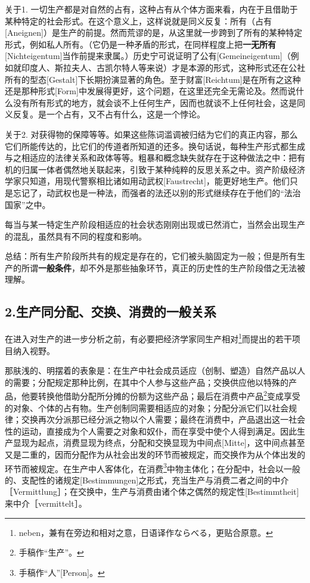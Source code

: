 \documentclass[a5paper,twoside,10.5pt]{ctexart}
\begin{document}
关于1. 一切生产都是对自然的占有，这种占有从个体方面来看，内在于且借助于某种特定的社会形式。在这个意义上，这样说就是同义反复：所有（占有[Aneignen]）是生产的前提。然而荒谬的是，从这里就一步跨到了所有的某种特定形式，例如私人所有。（它仍是一种矛盾的形式，在同样程度上把\textbf{一无所有}[Nichteigentum]当作前提来隶属。）历史宁可说证明了公有[Gemeineigentum]（例如就印度人、斯拉夫人、古凯尔特人等来说）才是本源的形式，这种形式还在公社所有的型态[Gestalt]下长期扮演显著的角色。至于财富[Reichtum]是在所有之这种还是那种形式[Form]中发展得更好，这个问题，在这里还完全无需论及。然而说什么没有所有形式的地方，就会谈不上任何生产，因而也就谈不上任何社会，这是同义反复。是一个占有，又不占有什么，这是一个悖论。

关于2. 对获得物的保障等等。如果这些陈词滥调被归结为它们的真正内容，那么它们所能传达的，比它们的传道者所知道的还多。换句话说，每种生产形式都生成与之相适应的法律关系和政体等等。粗暴和概念缺失就存在于这种做法之中：把有机的归属一体者偶然地关联起来，引致于某种纯粹的反思关系之中。资产阶级经济学家只知道，用现代警察相比诸如用动武权[Faustrecht]，能更好地生产。他们只是忘记了，动武权也是一种法，而强者的法还以别的形式继续存在于他们的“法治国家”之中。

每当与某一特定生产阶段相适应的社会状态刚刚出现或已然消亡，当然会出现生产的混乱，虽然具有不同的程度和影响。

总结：所有生产阶段所共有的规定是存在的，它们被头脑固定为一般；但是所有生产的所谓\textbf{一般条件}，却不外是那些抽象环节，真正的历史性的生产阶段借之无法被理解。

\newpage

\subsection{2.生产同分配、交换、消费的一般关系}

在进入对生产的进一步分析之前，有必要把经济学家同生产相对\footnote{neben，兼有在旁边和相对之意，日语译作ならべる，更贴合原意。}而提出的若干项目纳入视野。

那肤浅的、明摆着的表象是：在生产中社会成员适应（创制、塑造）自然产品以人的需要；分配规定那种比例，在其中个人参与这些产品；交换供应他以特殊的产品，他要转换他借助分配所分摊的份额为这些产品；最后在消费中产品\footnote{手稿作“生产”。}变成享受的对象、个体的占有物。生产创制同需要相适应的对象；分配分派它们以社会规律；交换再次分派那已经分派之物以个人需要；最终在消费中，产品退出这一社会性的运动，直接成为个人需要之对象和奴仆，而在享受中使个人得到满足。因此生产显现为起点，消费显现为终点，分配和交换显现为中间点[Mitte]，这中间点甚至又是二重的，因而分配作为从社会出发的环节而被规定，而交换作为从个体出发的环节而被规定。在生产中人客体化，在消费\footnote{手稿作“人”[Person]。}中物主体化；在分配中，社会以一般的、支配性的诸规定[Bestimmungen]之形式，充当生产与消费二者之间的中介［Vermittlung］；在交换中，生产与消费由诸个体之偶然的规定性[Bestimmtheit]来中介［vermittelt］。
\end{document}
